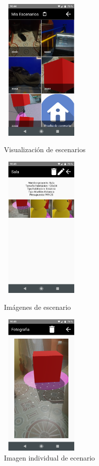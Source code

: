 \begin{figure}[hbt!]
	\begin{minipage}{0.32\textwidth}
		\centering
		\includegraphics[width=4cm,height=7cm]{imagenes/desarrollo/app/scenarios.png}
		\caption{Visualización de escenarios}
		\label{fig:readscenarios}
	\end{minipage}\hfill
	\begin{minipage}{0.32\textwidth}
		\centering
		\includegraphics[width=4cm,height=7cm]{imagenes/desarrollo/app/scenarios_img.png}
		\caption{Imágenes de escenario}
		\label{fig:scenarioimgs}
	\end{minipage}\hfill
	\begin{minipage}{0.32\textwidth}
		\centering
		\includegraphics[width=4cm,height=7cm]{imagenes/desarrollo/app/scenario_pic.png}
		\caption{Imagen individual de ecenario}
		\label{fig:scimg}
	\end{minipage}\hfill
\end{figure}

